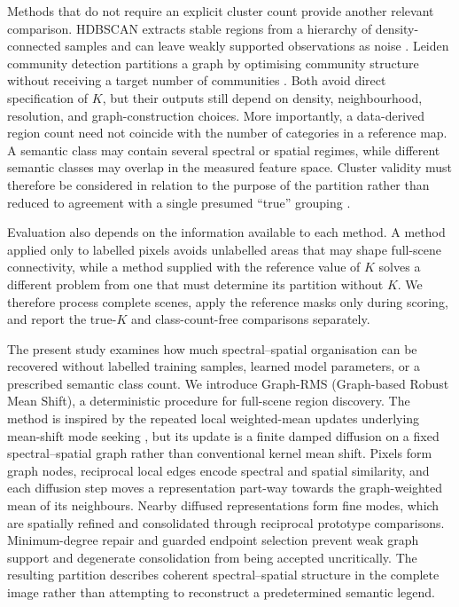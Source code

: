 \documentclass[10pt,a4paper,fleqn]{article}
\begin{document}
Methods that do not require an explicit cluster count provide another relevant
comparison. HDBSCAN extracts stable regions from a hierarchy of density-connected
samples and can leave weakly supported observations as noise
\citep{campello2013}. Leiden community detection partitions a graph by
optimising community structure without receiving a target number of communities
\citep{traag2019}. Both avoid direct specification of \(K\), but their outputs
still depend on density, neighbourhood, resolution, and graph-construction
choices. More importantly, a data-derived region count need not coincide with
the number of categories in a reference map. A semantic class may contain
several spectral or spatial regimes, while different semantic classes may
overlap in the measured feature space. Cluster validity must therefore be
considered in relation to the purpose of the partition rather than reduced to
agreement with a single presumed ``true'' grouping \citep{hennig2015}.

Evaluation also depends on the information available to each method. A method
applied only to labelled pixels avoids unlabelled areas that may shape
full-scene connectivity, while a method supplied with the reference value of
\(K\) solves a different problem from one that must determine its partition
without \(K\). We therefore process complete scenes, apply the reference masks
only during scoring, and report the true-\(K\) and class-count-free comparisons
separately.

The present study examines how much spectral--spatial organisation can be
recovered without labelled training samples, learned model parameters, or a
prescribed semantic class count. We introduce Graph-RMS (Graph-based Robust
Mean Shift), a deterministic procedure for full-scene region discovery. The
method is inspired by the repeated local weighted-mean updates underlying
mean-shift mode seeking \citep{cheng1995,comaniciu2002}, but its update is a
finite damped diffusion on a fixed spectral--spatial graph rather than
conventional kernel mean shift. Pixels form graph nodes, reciprocal local
edges encode spectral and spatial similarity, and each diffusion step moves a
representation part-way towards the graph-weighted mean of its neighbours.
Nearby diffused representations form fine modes,
which are spatially refined and consolidated through reciprocal prototype
comparisons. Minimum-degree repair and guarded endpoint selection prevent
weak graph support and degenerate consolidation from being accepted
uncritically. The resulting partition describes coherent spectral--spatial
structure in the complete image rather than attempting to reconstruct a
predetermined semantic legend.
\end{document}
